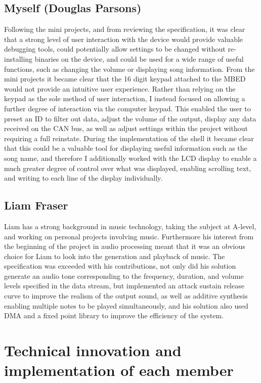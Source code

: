 \subsection*{Myself (Douglas Parsons)}
Following the mini projects, and from reviewing the specification, it was clear 
that a strong level of user interaction with the device would provide valuable 
debugging tools, could potentially allow settings to be changed without 
re-installing binaries on the device, and could be used for a wide range of 
useful functions, such as changing the volume or displaying song information. 
From the mini projects it became clear that the 16 digit keypad attached to the 
MBED would not provide an intuitive user experience. Rather than relying on 
the keypad as the sole method of user interaction, I instead focused 
on allowing a further degree of interaction via the computer keypad. This 
enabled the user to preset an ID to filter out data, adjust the volume of the 
output, display any data received on the CAN bus, as 
well as adjust settings within the project without requiring a full reinstate.
During the implementation of the shell it became clear that this could be a 
valuable tool for displaying useful information such as the song name, and 
therefore I additionally worked with the LCD display to enable a much greater 
degree of control over what was displayed, enabling scrolling text, and writing 
to each line of the display individually.

\subsection*{Liam Fraser}
Liam has a strong background in music technology, taking the subject at A-level,
and working on personal projects involving music. Furthermore his interest from 
the beginning of the project in audio processing meant that it was an obvious 
choice for Liam to look into the generation and playback of music. The 
specification was exceeded with his contributions, not only did his solution 
generate an audio tone corresponding to the frequency, duration, and volume 
levels specified in the data stream, but implemented an attack sustain release 
curve to improve the realism of the output sound, as well as additive synthesis 
enabling multiple notes to be played simultaneously, and his solution also 
used DMA and a fixed point library to improve the efficiency of the system. 

\section{Technical innovation and implementation of each member}
